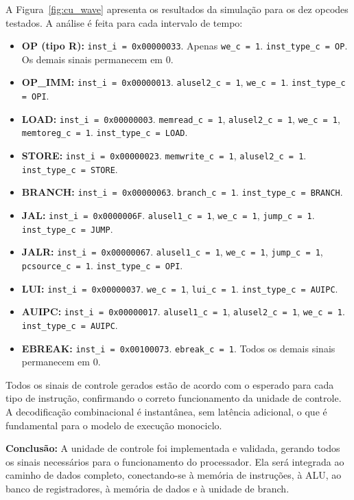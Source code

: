 \documentclass[
	12pt,				%
	oneside,
	a4paper,			%
	english,			%
	french,				%
	spanish,			%
	brazil,				%
	]{abntex2}
\begin{document}
A Figura~\ref{fig:cu_wave} apresenta os resultados da simulação para os dez opcodes testados. A análise é feita para cada intervalo de tempo:

\begin{itemize}
  \item \textbf{OP (tipo R):} \texttt{inst\_i = 0x00000033}. Apenas \texttt{we\_c = 1}. \texttt{inst\_type\_c = OP}. Os demais sinais permanecem em 0.
  \item \textbf{OP\_IMM:} \texttt{inst\_i = 0x00000013}. \texttt{alusel2\_c = 1}, \texttt{we\_c = 1}. \texttt{inst\_type\_c = OPI}.
  \item \textbf{LOAD:} \texttt{inst\_i = 0x00000003}. \texttt{memread\_c = 1}, \texttt{alusel2\_c = 1}, \texttt{we\_c = 1}, \texttt{memtoreg\_c = 1}. \texttt{inst\_type\_c = LOAD}.
  \item \textbf{STORE:} \texttt{inst\_i = 0x00000023}. \texttt{memwrite\_c = 1}, \texttt{alusel2\_c = 1}. \texttt{inst\_type\_c = STORE}.
  \item \textbf{BRANCH:} \texttt{inst\_i = 0x00000063}. \texttt{branch\_c = 1}. \texttt{inst\_type\_c = BRANCH}.
  \item \textbf{JAL:} \texttt{inst\_i = 0x0000006F}. \texttt{alusel1\_c = 1}, \texttt{we\_c = 1}, \texttt{jump\_c = 1}. \texttt{inst\_type\_c = JUMP}.
  \item \textbf{JALR:} \texttt{inst\_i = 0x00000067}. \texttt{alusel1\_c = 1}, \texttt{we\_c = 1}, \texttt{jump\_c = 1}, \texttt{pcsource\_c = 1}. \texttt{inst\_type\_c = OPI}.
  \item \textbf{LUI:} \texttt{inst\_i = 0x00000037}. \texttt{we\_c = 1}, \texttt{lui\_c = 1}. \texttt{inst\_type\_c = AUIPC}.
  \item \textbf{AUIPC:} \texttt{inst\_i = 0x00000017}. \texttt{alusel1\_c = 1}, \texttt{alusel2\_c = 1}, \texttt{we\_c = 1}. \texttt{inst\_type\_c = AUIPC}.
  \item \textbf{EBREAK:} \texttt{inst\_i = 0x00100073}. \texttt{ebreak\_c = 1}. Todos os demais sinais permanecem em 0.
\end{itemize}

Todos os sinais de controle gerados estão de acordo com o esperado para cada tipo de instrução, confirmando o correto funcionamento da unidade de controle. A decodificação combinacional é instantânea, sem latência adicional, o que é fundamental para o modelo de execução monociclo.

\noindent \textbf{Conclusão:} A unidade de controle foi implementada e validada, gerando todos os sinais necessários para o funcionamento do processador. Ela será integrada ao caminho de dados completo, conectando-se à memória de instruções, à ALU, ao banco de registradores, à memória de dados e à unidade de branch.
\end{document}
